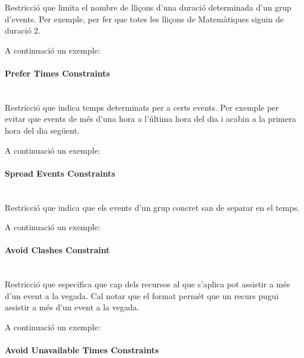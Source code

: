 \documentclass[11pt,a4paper,twoside]{report}
\begin{document}
  Restricció que limita el nombre de lliçons d'una duració determinada d'un grup d'events. Per exemple, per fer que totes les lliçons de Matemàtiques siguin de duració 2.


  A continuació un exemple:

  

  \paragraph*{Prefer Times Constraints} ~\\

  Restricció que indica temps determinats per a certs events. Per exemple per evitar que events de més d'una hora a l'última hora del dia i acabin a la primera hora del dia següent.

  A continuació un exemple:

  


  \paragraph*{Spread Events Constraints} ~\\

  Restricció que indica que els events d'un grup concret san de separar en el temps.

  A continuació un exemple:

  


  \paragraph*{Avoid Clashes Constraint} ~\\
  
  Restricció que especifica que cap dels recursos al que s'aplica pot assistir a més d'un event a la vegada. 
  Cal notar que el format permét que un recurs pugui assistir a més d'un event a la vegada.

  A continuació un exemple:

  
  
  \paragraph*{Avoid Unavailable Times Constraints} ~\\
\end{document}
